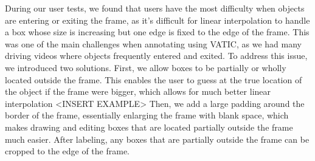 During our user tests, we found that users have the most difficulty when objects are entering or exiting the frame, as it's difficult for linear interpolation to handle a box whose size is increasing but one edge is fixed to the edge of the frame.
This was one of the main challenges when annotating using VATIC, as we had many driving videos where objects frequently entered and exited.
To address this issue, we introduced two solutions.
First, we allow boxes to be partially or wholly located outside the frame.
This enables the user to guess at the true location of the object if the frame were bigger, which allows for much better linear interpolation <INSERT EXAMPLE>
Then, we add a large padding around the border of the frame, essentially enlarging the frame with blank space, which makes drawing and editing boxes that are located partially outside the frame much easier.
After labeling, any boxes that are partially outside the frame can be cropped to the edge of the frame.








